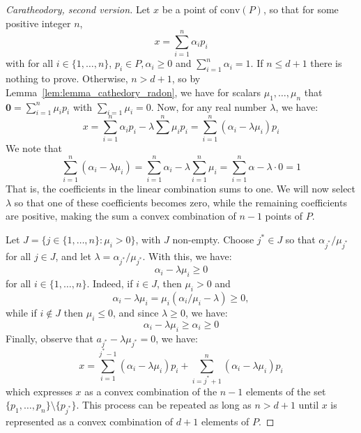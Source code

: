 \begin{proof}[Caratheodory, second version]
    Let $x$ be a point of $\mathrm{conv}(P)$, so that for some positive integer $n$, \begin{equation}
        x=\sum^{n}_{i=1} \alpha_{i}p_{i}
    \end{equation}
    with for all $i\in \{1,\dots,n\}$, $p_{i}\in P, \alpha_{i}\geq 0$ and $\sum^{n}_{i=1}\alpha_{i}=1$. If $n\leq d+1$ there is nothing to prove. Otherwise, $n>d+1$, so by Lemma~\ref{lem:lemma_cathedory_radon}, we have for scalars $\mu_{1},\dots,\mu_{n}$ that $\mathbf{0}=\sum^{n}_{i=1}\mu_{i}p_{i}$ with $\sum^{}_{i=1}\mu_{i}=0$. Now, for any real number $\lambda$, we have: 
    \begin{equation}
        x=\sum^{n}_{i=1}\alpha_{i}p_{i} - \lambda \sum^{n}\mu_{i}p_{i} = \sum^{n}_{i=1} (\alpha_{i}-\lambda \mu_{i})p_{i} 
    \end{equation}
    We note that 
    \begin{equation}
        \sum^{n}_{i=1}(\alpha_{i}-\lambda \mu_{i}) = \sum^{n}_{i=1}\alpha_{i} - \lambda \sum^{n}_{i=1}\mu_{i} = \sum^{n}_{i=1}\alpha - \lambda \cdot 0 = 1
    \end{equation}
    That is, the coefficients in the linear combination sums to one. We will now select $\lambda$ so that one of these coefficients becomes zero, while the remaining coefficients are positive, making the sum a convex combination of $n-1$ points of $P$. 

    Let $J=\{j\in \{1,\dots,n\}: \mu_{i}>0\}$, with $J$ non-empty. Choose $j^{*}\in J$ so that $\alpha_{j^{*}}/\mu_{j^{*}}$ for all $j\in J$, and let $\lambda = \alpha_{j^{*}}/\mu_{j^{*}}$. With this, we have: 
    \begin{equation}
        \alpha_{i} - \lambda \mu_{i} \geq 0
    \end{equation}
    for all $i\in \{1,\dots,n\}$. Indeed, if $i\in J$, then $\mu_{i}>0$ and 
    \begin{equation}
        \alpha_{i} - \lambda \mu_{i} = \mu_{i} (\alpha_{i}/\mu_{i}-\lambda)\geq 0,
    \end{equation}
    while if $i\not\in J$ then $\mu_{i}\leq 0$, and since $\lambda\geq 0$, we have: 
    \begin{equation}
        \alpha_{i}-\lambda\mu_{i} \geq \alpha_{i} \geq 0
    \end{equation}
    Finally, observe that $a_{j^{*}}-\lambda\mu_{j^{*}}=0$, we have: 
    \begin{equation}
        x=\sum^{j^{*}-1}_{i=1} (\alpha_{i}-\lambda\mu_{i})p_{i} + \sum^{n}_{i=j^{*}+1} (\alpha_{i}-\lambda \mu_{i})p_{i}
    \end{equation}
    which expresses $x$ as a convex combination of the $n-1$ elements of the set $\{p_{1},\dots,p_{n}\}\setminus \{p_{j^{*}}\}$. This process can be repeated as long as $n>d+1$ until $x$ is represented as a convex combination of $d+1$ elements of $P$. 
\end{proof}
